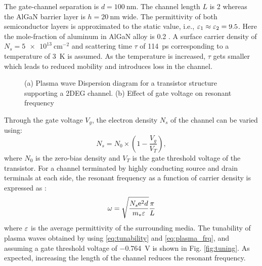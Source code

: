\documentclass[12pt]{article}
\begin{document}
The gate-channel separation is $d = \SI{100}{\nm}$. The channel length $L$ is \SI{2}{\micm} whereas the AlGaN barrier layer is $h = \SI{20}{\nm}$ wide.
The permittivity of both semiconductor layers is approximated to the static value, i.e., $\varepsilon_1 \approx \varepsilon_2 = 9.5$. Here the mole-fraction of aluminum in AlGaN alloy is \SI{.2}{} \cite{Muravjov2010}. A surface carrier density of $N_s = \SI{5e13}{\cm^{-2}}$ and scattering time $\tau$ of \SI{114}{\ps} corresponding to a temperature of \SI{3}{\kelvin} is assumed. As the temperature is increased, $\tau$ gets smaller which leads to reduced mobility and introduces loss in the channel.
%
\begin{figure}[t!]
      \hfil
  \caption{(a) Plasma wave Dispersion diagram for a transistor structure supporting a 2DEG channel. (b) Effect of gate voltage on resonant frequency}
  \label{fig:matlab_simulation}
\end{figure}
%
Through the gate voltage $V_g$, the electron density $N_s$ of the channel can be varied using:
%
\begin{equation}
  N_s = N_0 \times \left(1 - \frac{V_g}{V_T} \right),
  \label{eq:tunability}
\end{equation}
%
where $N_0$ is the zero-bias density and $V_T$ is the gate threshold voltage of the transistor. For a channel terminated by highly conducting source and drain terminals at each side, the resonant frequency as a function of carrier density is expressed as \cite{Popov2008}:
%
\begin{equation}
  \omega = \sqrt{\frac{N_s \mathrm{e}^2 d}{m_{\ast} \varepsilon}} \frac{\pi}{L}
  \label{eq:plasma_frq}
\end{equation}
%
where $\varepsilon$ is the average permittivity of the surrounding media. The tunability of plasma waves obtained by using \eqref{eq:tunability} and \eqref{eq:plasma_frq}, and assuming a gate threshold voltage of \SI{-.764}{\volt} is shown in Fig. \ref{fig:tuning}. As expected, increasing the length of the channel reduces the resonant frequency.
%
%
%
\end{document}
